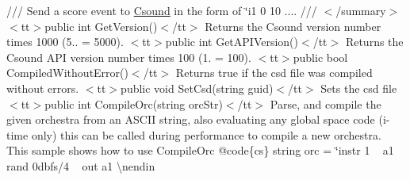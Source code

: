 /// Send a score event to \mbox{\hyperlink{namespace_csound}{Csound}} in the form of \char`\"{}i1 0 10 .... /// $<$/summary$>$  $<$tt$>$public int Get\+Version()$<$/tt$>$  \+Returns the Csound version number times 1000 (5.. = 5000).  $<$tt$>$public int Get\+APIVersion()$<$/tt$>$  \+Returns the Csound API version number times 100 (1. = 100).  $<$tt$>$public bool Compiled\+Without\+Error()$<$/tt$>$  \+Returns true if the csd file was compiled without errors.  $<$tt$>$public void Set\+Csd(string guid)$<$/tt$>$  \+Sets the csd file  $<$tt$>$public int Compile\+Orc(string orc\+Str)$<$/tt$>$  \+Parse, and compile the given orchestra from an ASCII string, also evaluating any global space code (i-\/time only) this can be called during performance to compile a new orchestra.  \+This sample shows how to use Compile\+Orc  @code\{cs\}  string orc = \char`\"{}instr 1 ~\newline
 a1 rand 0dbfs/4 ~\newline
 out a1 \textbackslash{}nendin~\newline
